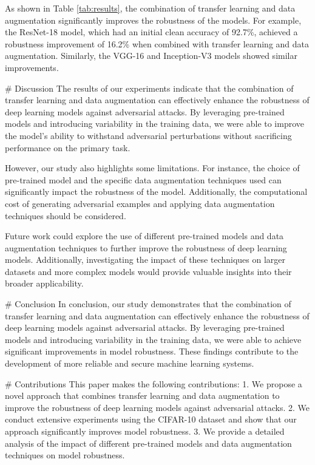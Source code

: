 As shown in Table \ref{tab:results}, the combination of transfer learning and data augmentation significantly improves the robustness of the models. For example, the ResNet-18 model, which had an initial clean accuracy of 92.7\%, achieved a robustness improvement of 16.2\% when combined with transfer learning and data augmentation. Similarly, the VGG-16 and Inception-V3 models showed similar improvements.

# Discussion
The results of our experiments indicate that the combination of transfer learning and data augmentation can effectively enhance the robustness of deep learning models against adversarial attacks. By leveraging pre-trained models and introducing variability in the training data, we were able to improve the model's ability to withstand adversarial perturbations without sacrificing performance on the primary task.

However, our study also highlights some limitations. For instance, the choice of pre-trained model and the specific data augmentation techniques used can significantly impact the robustness of the model. Additionally, the computational cost of generating adversarial examples and applying data augmentation techniques should be considered.

Future work could explore the use of different pre-trained models and data augmentation techniques to further improve the robustness of deep learning models. Additionally, investigating the impact of these techniques on larger datasets and more complex models would provide valuable insights into their broader applicability.

# Conclusion
In conclusion, our study demonstrates that the combination of transfer learning and data augmentation can effectively enhance the robustness of deep learning models against adversarial attacks. By leveraging pre-trained models and introducing variability in the training data, we were able to achieve significant improvements in model robustness. These findings contribute to the development of more reliable and secure machine learning systems.

# Contributions
This paper makes the following contributions:
1. We propose a novel approach that combines transfer learning and data augmentation to improve the robustness of deep learning models against adversarial attacks.
2. We conduct extensive experiments using the CIFAR-10 dataset and show that our approach significantly improves model robustness.
3. We provide a detailed analysis of the impact of different pre-trained models and data augmentation techniques on model robustness.

